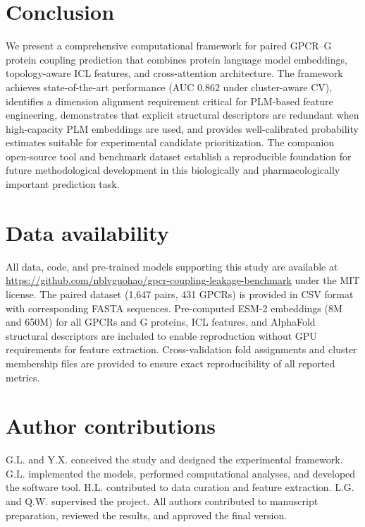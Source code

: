 \documentclass[11pt,a4paper]{article}
\begin{document}
\section{Conclusion}

We present a comprehensive computational framework for paired GPCR--G protein coupling prediction that combines protein language model embeddings, topology-aware ICL features, and cross-attention architecture. The framework achieves state-of-the-art performance (AUC 0.862 under cluster-aware CV), identifies a dimension alignment requirement critical for PLM-based feature engineering, demonstrates that explicit structural descriptors are redundant when high-capacity PLM embeddings are used, and provides well-calibrated probability estimates suitable for experimental candidate prioritization. The companion open-source tool and benchmark dataset establish a reproducible foundation for future methodological development in this biologically and pharmacologically important prediction task.

\section*{Data availability}

All data, code, and pre-trained models supporting this study are available at \url{https://github.com/nblvguohao/gpcr-coupling-leakage-benchmark} under the MIT license. The paired dataset (1,647 pairs, 431 GPCRs) is provided in CSV format with corresponding FASTA sequences. Pre-computed ESM-2 embeddings (8M and 650M) for all GPCRs and G proteins, ICL features, and AlphaFold structural descriptors are included to enable reproduction without GPU requirements for feature extraction. Cross-validation fold assignments and cluster membership files are provided to ensure exact reproducibility of all reported metrics.

\section*{Author contributions}

G.L. and Y.X. conceived the study and designed the experimental framework. G.L. implemented the models, performed computational analyses, and developed the software tool. H.L. contributed to data curation and feature extraction. L.G. and Q.W. supervised the project. All authors contributed to manuscript preparation, reviewed the results, and approved the final version.
\end{document}
